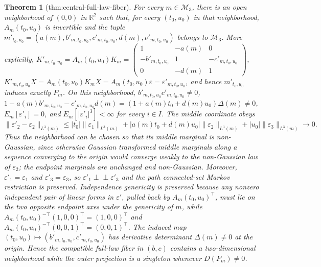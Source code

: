 \documentclass{article}
\newtheorem{theorem}{Theorem}
\begin{document}
\begin{theorem}[thm:central-full-law-fiber]\label{thm:central-full-law-fiber}
For every \(m\in\mathcal M_3\), there is an open neighborhood of \((0,0)\) in \(\mathbb R^2\) such that, for every \((t_0,u_0)\) in that neighborhood, \(A_m(t_0,u_0)\) is invertible and the tuple \(m'_{t_0,u_0}=(a(m),b'_{m,t_0,u_0},c'_{m,t_0,u_0},d(m),\nu'_{m,t_0,u_0})\) belongs to \(\mathcal M_3\). More explicitly, \(K'_{m,t_0,u_0}=A_m(t_0,u_0)K_m=\begin{pmatrix}1&-a(m)&0\\-b'_{m,t_0,u_0}&1&-c'_{m,t_0,u_0}\\0&-d(m)&1\end{pmatrix}\), \(K'_{m,t_0,u_0}X=A_m(t_0,u_0)K_mX=A_m(t_0,u_0)\varepsilon=\varepsilon'_{m,t_0,u_0}\), and hence \(m'_{t_0,u_0}\) induces exactly \(P_m\). On this neighborhood, \(b'_{m,t_0,u_0}c'_{m,t_0,u_0}\neq0\), \(1-a(m)b'_{m,t_0,u_0}-c'_{m,t_0,u_0}d(m)=(1+a(m)t_0+d(m)u_0)\Delta(m)\neq0\), \(E_m[\varepsilon'_i]=0\), and \(E_m[|\varepsilon'_i|^3]<\infty\) for every \(i\in I\). The middle coordinate obeys \[\|\varepsilon'_2-\varepsilon_2\|_{L^3(m)}\le |t_0|\|\varepsilon_1\|_{L^3(m)}+|a(m)t_0+d(m)u_0|\|\varepsilon_2\|_{L^3(m)}+|u_0|\|\varepsilon_3\|_{L^3(m)}\longrightarrow0.\] Thus the neighborhood can be chosen so that its middle marginal is non-Gaussian, since otherwise Gaussian transformed middle marginals along a sequence converging to the origin would converge weakly to the non-Gaussian law of \(\varepsilon_2\); the endpoint marginals are unchanged and non-Gaussian. Moreover, \(\varepsilon'_1=\varepsilon_1\) and \(\varepsilon'_3=\varepsilon_3\), so \(\varepsilon'_1\perp\!\!\!\perp\varepsilon'_3\) and the path connected-set Markov restriction is preserved. Independence genericity is preserved because any nonzero independent pair of linear forms in \(\varepsilon'\), pulled back by \(A_m(t_0,u_0)^\top\), must lie on the two opposite endpoint axes under the genericity of \(m\), while \(A_m(t_0,u_0)^{-\top}(1,0,0)^\top=(1,0,0)^\top\) and \(A_m(t_0,u_0)^{-\top}(0,0,1)^\top=(0,0,1)^\top\). The induced map \((t_0,u_0)\mapsto(b'_{m,t_0,u_0},c'_{m,t_0,u_0})\) has derivative determinant \(\Delta(m)\neq0\) at the origin. Hence the compatible full-law fiber in \((b,c)\) contains a two-dimensional neighborhood while the outer projection is a singleton whenever \(D(P_m)\neq0\).
\end{theorem}
\end{document}
